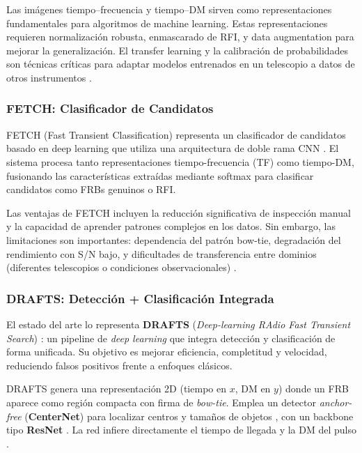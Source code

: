 Las imágenes tiempo–frecuencia y tiempo–DM sirven como representaciones fundamentales para algoritmos de machine learning. Estas representaciones requieren normalización robusta, enmascarado de RFI, y data augmentation para mejorar la generalización. El transfer learning y la calibración de probabilidades son técnicas críticas para adaptar modelos entrenados en un telescopio a datos de otros instrumentos \citep{Agarwal_2020}.

\subsubsection{FETCH: Clasificador de Candidatos}

FETCH (Fast Transient Classification) representa un clasificador de candidatos basado en deep learning que utiliza una arquitectura de doble rama CNN \citep{Agarwal_2020}. El sistema procesa tanto representaciones tiempo-frecuencia (TF) como tiempo-DM, fusionando las características extraídas mediante softmax para clasificar candidatos como FRBs genuinos o RFI.

Las ventajas de FETCH incluyen la reducción significativa de inspección manual y la capacidad de aprender patrones complejos en los datos. Sin embargo, las limitaciones son importantes: dependencia del patrón bow-tie, degradación del rendimiento con S/N bajo, y dificultades de transferencia entre dominios (diferentes telescopios o condiciones observacionales) \citep{Agarwal_2020}.

\subsubsection{DRAFTS: Detección + Clasificación Integrada}

El estado del arte lo representa \textbf{DRAFTS} (\textit{Deep-learning RAdio Fast Transient Search}) \citep{zhang2024drafts}: un pipeline de \textit{deep learning} que integra detección y clasificación de forma unificada. Su objetivo es mejorar eficiencia, completitud y velocidad, reduciendo falsos positivos frente a enfoques clásicos.

DRAFTS genera una representación 2D (tiempo en $x$, DM en $y$) donde un FRB aparece como región compacta con firma de \textit{bow-tie}. Emplea un detector \textit{anchor-free} (\textbf{CenterNet}) para localizar centros y tamaños de objetos \citep{Zhou_2019_CenterNet}, con un backbone tipo \textbf{ResNet} \citep{He_2015_ResNet}. La red infiere directamente el tiempo de llegada y la DM del pulso \citep{zhang2024drafts}.


